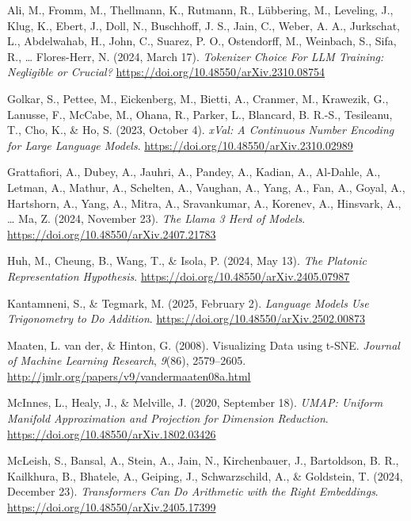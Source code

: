 \documentclass[
  a4paper, twoside, 10pt, titlepage]{book}
\newlength{\cslhangindent}
\newenvironment{CSLReferences}[2] %
 {\begin{list}{}{%
  \setlength{\itemindent}{0pt}
  \setlength{\leftmargin}{0pt}
  \setlength{\parsep}{0pt}
  \ifodd #1
   \setlength{\leftmargin}{\cslhangindent}
   \setlength{\itemindent}{-1\cslhangindent}
  \fi
  \setlength{\itemsep}{#2\baselineskip}}}
 {\end{list}}
\begin{document}
\label{refs}
\begin{CSLReferences}{1}{0}
Ali, M., Fromm, M., Thellmann, K., Rutmann, R., Lübbering, M., Leveling,
J., Klug, K., Ebert, J., Doll, N., Buschhoff, J. S., Jain, C., Weber, A.
A., Jurkschat, L., Abdelwahab, H., John, C., Suarez, P. O., Ostendorff,
M., Weinbach, S., Sifa, R., \ldots{} Flores-Herr, N. (2024, March 17).
\emph{Tokenizer {Choice For LLM Training}: {Negligible} or {Crucial}?}
\url{https://doi.org/10.48550/arXiv.2310.08754}

Golkar, S., Pettee, M., Eickenberg, M., Bietti, A., Cranmer, M.,
Krawezik, G., Lanusse, F., McCabe, M., Ohana, R., Parker, L., Blancard,
B. R.-S., Tesileanu, T., Cho, K., \& Ho, S. (2023, October 4).
\emph{{xVal}: {A Continuous Number Encoding} for {Large Language
Models}}. \url{https://doi.org/10.48550/arXiv.2310.02989}

Grattafiori, A., Dubey, A., Jauhri, A., Pandey, A., Kadian, A.,
Al-Dahle, A., Letman, A., Mathur, A., Schelten, A., Vaughan, A., Yang,
A., Fan, A., Goyal, A., Hartshorn, A., Yang, A., Mitra, A., Sravankumar,
A., Korenev, A., Hinsvark, A., \ldots{} Ma, Z. (2024, November 23).
\emph{The {Llama} 3 {Herd} of {Models}}.
\url{https://doi.org/10.48550/arXiv.2407.21783}

Huh, M., Cheung, B., Wang, T., \& Isola, P. (2024, May 13). \emph{The
{Platonic Representation Hypothesis}}.
\url{https://doi.org/10.48550/arXiv.2405.07987}

Kantamneni, S., \& Tegmark, M. (2025, February 2). \emph{Language
{Models Use Trigonometry} to {Do Addition}}.
\url{https://doi.org/10.48550/arXiv.2502.00873}

Maaten, L. van der, \& Hinton, G. (2008). Visualizing {Data} using
t-{SNE}. \emph{Journal of Machine Learning Research}, \emph{9}(86),
2579--2605. \url{http://jmlr.org/papers/v9/vandermaaten08a.html}

McInnes, L., Healy, J., \& Melville, J. (2020, September 18).
\emph{{UMAP}: {Uniform Manifold Approximation} and {Projection} for
{Dimension Reduction}}. \url{https://doi.org/10.48550/arXiv.1802.03426}

McLeish, S., Bansal, A., Stein, A., Jain, N., Kirchenbauer, J.,
Bartoldson, B. R., Kailkhura, B., Bhatele, A., Geiping, J.,
Schwarzschild, A., \& Goldstein, T. (2024, December 23).
\emph{Transformers {Can Do Arithmetic} with the {Right Embeddings}}.
\url{https://doi.org/10.48550/arXiv.2405.17399}


\end{CSLReferences}
\end{document}
